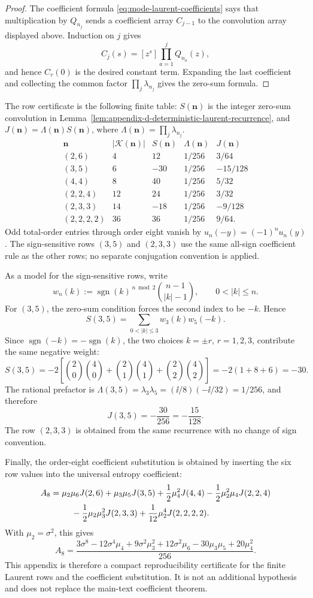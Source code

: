 \begin{proof}
The coefficient formula \eqref{eq:mode-laurent-coefficients} says that
multiplication by \(Q_{n_j}\) sends a coefficient array \(C_{j-1}\) to the
convolution array displayed above.  Induction on \(j\) gives
\[
  C_j(s)=[z^s]\prod_{a=1}^jQ_{n_a}(z),
\]
and hence \(C_r(0)\) is the desired constant term.  Expanding the last
coefficient and collecting the common factor
\(\prod_j\lambda_{n_j}\) gives the zero-sum formula.
\end{proof}

The row certificate is the following finite table: \(S(\mathbf n)\) is the
integer zero-sum convolution in
Lemma~\ref{lem:appendix-d-deterministic-laurent-recurrence}, and
\(J(\mathbf n)=\Lambda(\mathbf n)S(\mathbf n)\), where
\(\Lambda(\mathbf n)=\prod_j\lambda_{n_j}\).
\[
\begin{array}{c|r|r|c|c}
\mathbf n&|\mathcal K(\mathbf n)|&S(\mathbf n)&\Lambda(\mathbf n)&J(\mathbf n)\\
\hline
(2,6)&4&12&1/256&3/64\\
(3,5)&6&-30&1/256&-15/128\\
(4,4)&8&40&1/256&5/32\\
(2,2,4)&12&24&1/256&3/32\\
(2,3,3)&14&-18&1/256&-9/128\\
(2,2,2,2)&36&36&1/256&9/64 .
\end{array}
\]
Odd total-order entries through order eight vanish by
\(u_n(-y)=(-1)^nu_n(y)\).  The sign-sensitive rows
\((3,5)\) and \((2,3,3)\) use the same all-sign coefficient rule as the
other rows; no separate conjugation convention is applied.

As a model for the sign-sensitive rows, write
\[
w_n(k):=\operatorname{sgn}(k)^{\,n\bmod 2}
\binom{n-1}{|k|-1},\qquad 0<|k|\le n .
\]
For \((3,5)\), the zero-sum condition forces the second index to be \(-k\).
Hence
\[
S(3,5)
=\sum_{0<|k|\le3}w_3(k)w_5(-k).
\]
Since \(\operatorname{sgn}(-k)=-\operatorname{sgn}(k)\), the two choices
\(k=\pm r\), \(r=1,2,3\), contribute the same negative weight:
\[
S(3,5)
=-2\left[
\binom20\binom40+\binom21\binom41+\binom22\binom42
\right]
=-2(1+8+6)=-30.
\]
The rational prefactor is
\(\Lambda(3,5)=\lambda_3\lambda_5=(\ii/8)(-\ii/32)=1/256\), and therefore
\[
J(3,5)=-\frac{30}{256}=-\frac{15}{128}.
\]
The row \((2,3,3)\) is obtained from the same recurrence with no change of
sign convention.

Finally, the order-eight coefficient substitution is obtained by inserting
the six row values into the universal entropy coefficient:
\[
\begin{aligned}
A_8&=\mu_2\mu_6J(2,6)+\mu_3\mu_5J(3,5)
+\frac12\mu_4^2J(4,4)
-\frac12\mu_2^2\mu_4J(2,2,4)\\
&\hspace{2.5em}
-\frac12\mu_2\mu_3^2J(2,3,3)
+\frac1{12}\mu_2^4J(2,2,2,2).
\end{aligned}
\]
With \(\mu_2=\sigma^2\), this gives
\[
A_8=
\frac{3\sigma^8-12\sigma^4\mu_4+9\sigma^2\mu_3^2
+12\sigma^2\mu_6-30\mu_3\mu_5+20\mu_4^2}{256}.
\]
This appendix is therefore a compact reproducibility certificate for the
finite Laurent rows and the coefficient substitution.  It is not an
additional hypothesis and does not replace the main-text coefficient theorem.
